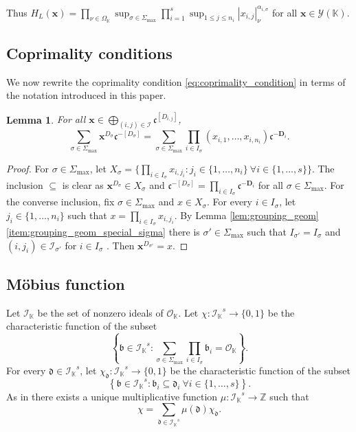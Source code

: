 \documentclass[10pt, a4paper, reqno, english]{amsart}
\newcommand\ZZ{\mathbb{Z}}
\newcommand{\KK}{\mathbb{K}} %
\newcommand{\ic}[1]{\mathcal{I}_{#1}} %
\newcommand{\indexset}{{\mathcal I}} %
\newcommand{\ideals}{{\mathcal I_{\KK}}} %
\newcommand{\divclass}{{\mathbf D}} %
\newtheorem{lemma}[theorem]{Lemma}
\theoremstyle{definition}
\numberwithin{theorem}{section}
\numberwithin{equation}{section}
\begin{document}
Thus $H_L(\mathbf x)=\prod_{\nu\in\Omega_{\KK}}\sup_{\sigma\in\Sigma_{\max}}\prod_{i=1}^s\sup_{1\leq j\leq n_{i}}|x_{i,j}|_\nu^{\alpha_{i,\sigma}}$ for all $\mathbf x\in\mathscr Y(\KK)$.


	
	

\subsection{Coprimality conditions}
We now rewrite the coprimality condition \eqref{eq:coprimality_condition} in terms of the notation introduced in this paper.

\begin{lemma}\label{lem:grouping_coprimality}
For all $\mathbf x\in \bigoplus_{(i,j)\in\indexset}\mathfrak c^{[D_{i,j}]}$,
$$\sum_{\sigma\in \Sigma_{\max}}\mathbf x^{D_\sigma}\mathfrak c^{-[D_\sigma]}=\sum_{\sigma\in\Sigma_{\max}}\prod_{i\in I_\sigma}(x_{i,1},\dots,x_{i,n_i})\mathfrak c^{-\divclass_i}.$$
\end{lemma}
\begin{proof}
For $\sigma\in\Sigma_{\max}$, let $X_{\sigma}=\{\prod_{i\in I_\sigma}x_{i,j_i}: j_i\in\{1,\dots,n_i\} \ \forall i\in\{1,\dots,s\}\}$.
The inclusion $\subseteq$ is clear as $\mathbf x^{D_\sigma}\in X_{\sigma}$ and $\mathfrak c^{-[D_\sigma]}=\prod_{i\in I_\sigma}\mathfrak c^{-\divclass_i}$ for all $\sigma\in \Sigma_{\max}$. 
For the converse inclusion, fix $\sigma\in\Sigma_{\max}$ and $x\in X_{\sigma}$. For every $i\in I_\sigma$, let $j_i\in\{1,\dots,n_i\}$ such that $x=\prod_{i\in I_\sigma}x_{i,j_i}$.   By Lemma \ref{lem:grouping_geom}\ref{item:grouping_geom_special_sigma} there is $\sigma'\in\Sigma_{\max}$ such that $I_{\sigma'}=I_\sigma$ and $(i,j_{i})\in\ic{\sigma'}$ for $i\in I_\sigma$ . Then $\mathbf x^{D_{\sigma'}}=x$.
\end{proof}
	
	

\subsection{M\"obius function}
\label{subsec:mobius}
Let $\ideals$ be the set of nonzero ideals of $\mathcal O_\KK$. Let $\chi:\ideals^s\to\{0,1\}$ be the characteristic function of the subset
\begin{equation}
\label{eq:gcd}
\left\{\mathfrak b\in\ideals^s: \sum_{\sigma\in\Sigma_{\max}}\prod_{i\in I_\sigma}\mathfrak b_i=\mathcal O_{\KK}\right\}.
\end{equation}
For every $\mathfrak d\in\ideals^s$, let $\chi_{\mathfrak d}:\ideals^s\to\{0,1\}$ be the characteristic function of the subset
$$
\left\{ \mathfrak b\in \ideals^s:\mathfrak b_i\subseteq\mathfrak d_i \ \forall i\in\{1,\dots,s\}\right\}.
$$
As in \cite[Lemme 8.5.1]{MR1340296} there exists a unique multiplicative function $\mu:\ideals^s\to\ZZ$ such that 
$$
\chi=\sum_{\mathfrak d\in \ideals^s}\mu(\mathfrak d)\chi_{\mathfrak d}.
$$
\end{document}

